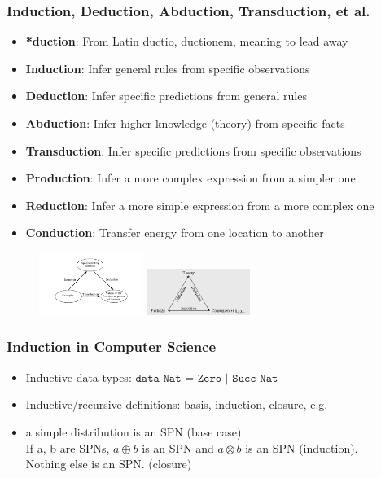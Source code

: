 \documentclass{beamer}
\begin{document}
  \begin{frame}
    \frametitle{Induction, Deduction, Abduction, Transduction, et al.}
    \begin{itemize}
      \item \textbf{*duction}:     From Latin ductio, ductionem, meaning to lead away
      \item \textbf{Induction}:    Infer general rules from specific observations
      \item \textbf{Deduction}:    Infer specific predictions from general rules
      \item \textbf{Abduction}:    Infer higher knowledge (theory) from specific facts
      \item \textbf{Transduction}: Infer specific predictions from specific observations
      \item \textbf{Production}:   Infer a more complex expression from a simpler one
      \item \textbf{Reduction}:    Infer a more simple expression from a more complex one
      \item \textbf{Conduction}:   Transfer energy from one location to another
    \end{itemize}
    \begin{figure}[H]
      \centering
      \includegraphics[width=0.3\textwidth]{../clipart/induction_deduction_transduction.png}
      \includegraphics[width=0.3\textwidth]{../clipart/induction_deduction_abduction.png}
    \end{figure}
  \end{frame}

  \begin{frame}
    \frametitle{Induction in Computer Science}
    \begin{itemize}
      \item Inductive data types: $\texttt{data Nat = Zero | Succ Nat}$
      \item Inductive/recursive definitions: basis, induction, closure, e.g.
      \item a simple distribution is an SPN (base case). \\If a, b are SPNs, $a \oplus b$ is an SPN and $a \otimes b$ is an SPN (induction).\\ Nothing else is an SPN. (closure)
    \end{itemize}
  \end{frame}
\end{document}
